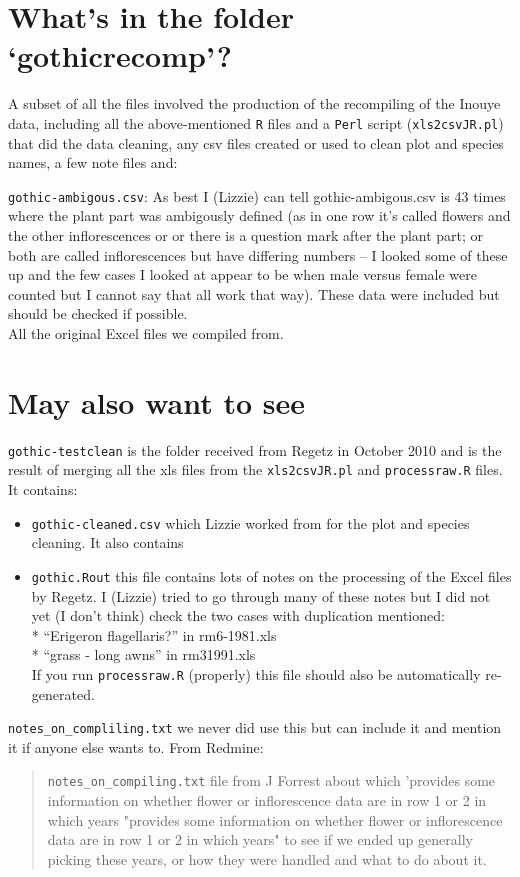 \documentclass[11pt,a4paper]{article}
\begin{document}
\section{What's in the folder `gothicrecomp'?}
A subset of all the files involved the production of the recompiling
of the Inouye data, including all the above-mentioned \verb|R| files
and a \verb|Perl| script (\verb|xls2csvJR.pl|) that did the data cleaning, any csv files
created or used to clean plot and species names, a few note files
and:

\verb|gothic-ambigous.csv|: As best I (Lizzie) can tell
gothic-ambigous.csv is 43 times where the plant part was ambigously
defined (as in one row it's called flowers and the other
inflorescences or or there is a question mark after the plant part; or
both are called inflorescences but have differing numbers -- I looked
some of these up and the few cases I looked at appear to be when male
versus female were counted but I cannot say that all work that
way). These data were included but should be checked if possible. \\

All the original Excel files we compiled from. 

\section{May also want to see}
\verb|gothic-testclean| is the folder received from Regetz in October
2010 and is the result of merging all the xls files from the
\verb|xls2csvJR.pl| and \verb|processraw.R| files. It contains:
\begin{itemize}
\item \verb|gothic-cleaned.csv| which Lizzie worked from for the plot
and species cleaning. It also contains
\item \verb|gothic.Rout| this file contains lots of notes
on the processing of the Excel files by Regetz. I (Lizzie) tried to go through
many of these notes but I did not yet (I don't think) check the two
cases with duplication mentioned:\\
* ``Erigeron  flagellaris?'' in rm6-1981.xls\\
* ``grass - long awns'' in rm31991.xls\\
If you run \verb|processraw.R| (properly) this file
should also be automatically re-generated.
\end{itemize}

\verb|notes_on_compliling.txt| we never did use this but can include it
and mention it if anyone else wants to. From Redmine: 
\begin{quote}
\verb|notes_on_compiling.txt| file from J Forrest about which 'provides some
information on whether flower or inflorescence data are in row 1 or 2
in which years "provides some information on whether flower or
inflorescence data are in row 1 or 2 in which years" to see if we
ended up generally picking these years, or how they were handled and
what to do about it.
\end{quote}
\end{document}
